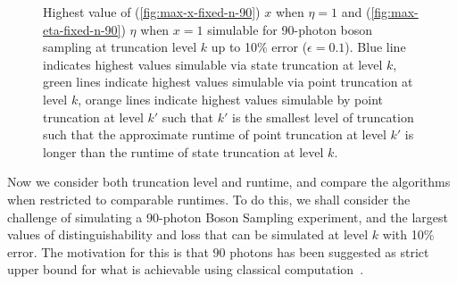 \begin{figure}
\hfill
{}
\caption[Highest value of $x$ and $\eta=1$ simulable for 90-photon boson sampling at truncation level $k$]{\label{fig:fixed-n-90} 
Highest value of (\ref{fig:max-x-fixed-n-90}) $x$ when $\eta=1$ and (\ref{fig:max-eta-fixed-n-90}) $\eta$ when $x=1$ simulable for 90-photon boson sampling at truncation level $k$ up to 10\% error ($\epsilon=0.1$). 
Blue line indicates highest values simulable via state truncation at level $k$, green lines indicate highest values simulable via point truncation at level $k$, orange lines indicate highest values simulable by point truncation at level $k'$ such that $k'$ is the smallest level of truncation such that the approximate runtime of point truncation at level $k'$ is longer than the runtime of state truncation at level $k$.}
\end{figure}

Now we consider both truncation level and runtime, and compare the algorithms when restricted to comparable runtimes. 
To do this, we shall consider the challenge of simulating a 90-photon Boson Sampling experiment, and the largest values of distinguishability and loss that can be simulated at level $k$ with 10\% error. 
The motivation for this is that $90$ photons has been suggested as strict upper bound for what is achievable using classical computation~\cite{dalzell2018}. 

